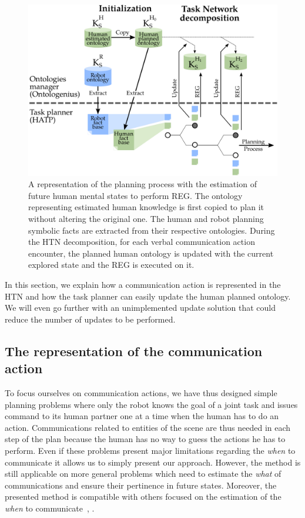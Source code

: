 \begin{figure}[!ht]
\centering
\includegraphics[scale=0.4]{figures/chapter5/integration.png}
\caption{\label{fig:chap5_integration} A representation of the planning process with the estimation of future human mental states to perform REG. The ontology representing estimated human knowledge is first copied to plan it without altering the original one. The human and robot planning symbolic facts are extracted from their respective ontologies. During the HTN decomposition, for each verbal communication action encounter, the planned human ontology is updated with the current explored state and the REG is executed on it. }
\end{figure}

In this section, we explain how a communication action is represented in the HTN and how the task planner can easily update the human planned ontology. We will even go further with an unimplemented update solution that could reduce the number of updates to be performed. 


\subsection{The representation of the communication action}

To focus ourselves on communication actions, we have thus designed simple planning problems where only the robot knows the goal of a joint task and issues command to its human partner one at a time when the human has to do an action. Communications related to entities of the scene are thus needed in each step of the plan because the human has no way to guess the actions he has to perform. Even if these problems present major limitations regarding the \textit{when} to communicate it allows us to simply present our approach. However, the method is still applicable on more general problems which need to estimate the \textit{what} of communications and ensure their pertinence in future states. Moreover, the presented method is compatible with others focused on the estimation of the \textit{when} to communicate~\cite{devin_2016_implemented}, \cite{unhelkar_2020_decision}.

